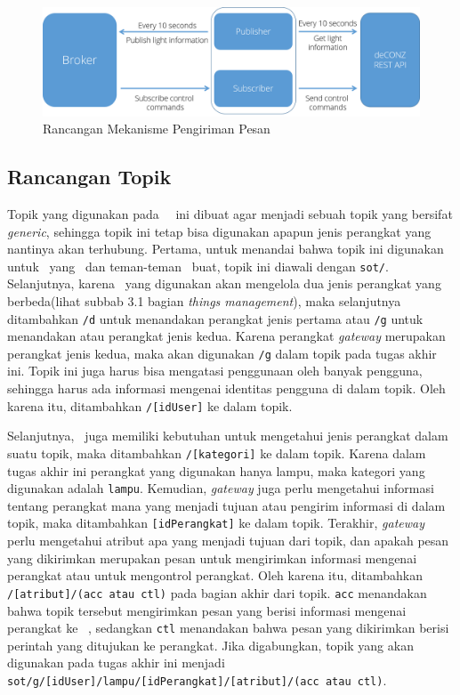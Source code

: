 \begin{figure}
	\centering
	\includegraphics[width=.9\textwidth]{pics/rancangan-pengiriman-pesan.png}
	\caption{Rancangan Mekanisme Pengiriman Pesan}
	\label{fig:rancanan-pengiriman-pesan}
\end{figure}

\subsection{Rancangan Topik}
Topik yang digunakan pada \plat~\iot~ini dibuat agar menjadi sebuah topik yang bersifat \textit{generic}, sehingga topik ini tetap bisa digunakan apapun jenis perangkat yang nantinya akan terhubung. Pertama, untuk menandai bahwa topik ini digunakan untuk \plat~yang \saya~dan teman-teman \saya~buat, topik ini diawali dengan \texttt{sot/}. Selanjutnya, karena \plat~yang digunakan akan mengelola dua jenis perangkat yang berbeda(lihat subbab 3.1 bagian \textit{things management}), maka selanjutnya ditambahkan \texttt{/d} untuk menandakan perangkat jenis pertama atau \texttt{/g} untuk menandakan atau perangkat jenis kedua. Karena perangkat \textit{gateway} merupakan perangkat jenis kedua, maka akan digunakan \texttt{/g} dalam topik pada tugas akhir ini. Topik ini juga harus bisa mengatasi penggunaan oleh banyak pengguna, sehingga harus ada informasi mengenai identitas pengguna di dalam topik. Oleh karena itu, ditambahkan \texttt{/[idUser]} ke dalam topik.

Selanjutnya, \plat~juga memiliki kebutuhan untuk mengetahui jenis perangkat dalam suatu topik, maka ditambahkan \texttt{/[kategori]} ke dalam topik. Karena dalam tugas akhir ini perangkat yang digunakan hanya lampu, maka kategori yang digunakan adalah \texttt{lampu}. Kemudian, \textit{gateway} juga perlu mengetahui informasi tentang perangkat mana yang menjadi tujuan atau pengirim informasi di dalam topik, maka ditambahkan \texttt{[idPerangkat]} ke dalam topik. Terakhir, \textit{gateway} perlu mengetahui atribut apa yang menjadi tujuan dari topik, dan apakah pesan yang dikirimkan merupakan pesan untuk mengirimkan informasi mengenai perangkat atau untuk mengontrol perangkat. Oleh karena itu, ditambahkan \texttt{/[atribut]/(acc atau ctl)} pada bagian akhir dari topik. \texttt{acc} menandakan bahwa topik tersebut mengirimkan pesan yang berisi informasi mengenai perangkat ke \plat~, sedangkan \texttt{ctl} menandakan bahwa pesan yang dikirimkan berisi perintah yang ditujukan ke perangkat. Jika digabungkan, topik yang akan digunakan pada tugas akhir ini menjadi \texttt{sot/g/[idUser]/lampu/[idPerangkat]/[atribut]/(acc atau ctl)}.

